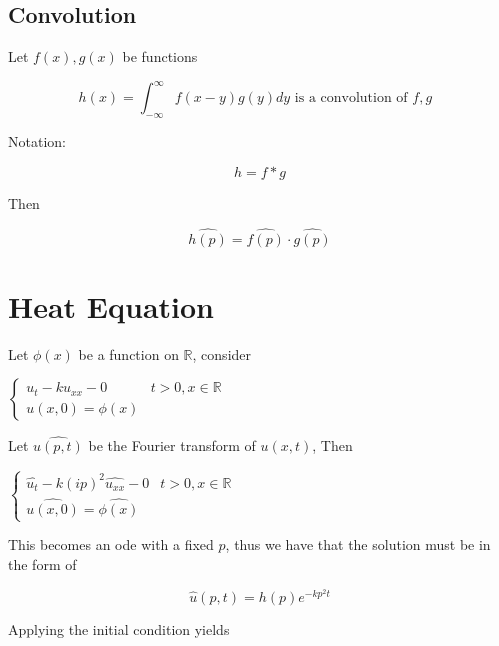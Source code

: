 \documentclass{article}
\newtheorem{one minute paper}[theorem]{One Minute Paper}
\begin{document}
\subsection*{Convolution}

Let $f(x), g(x)$ be functions

\begin{equation}
    h(x) = \int_{-\infty}^{\infty}f(x-y)g(y)dy \textrm{ is a convolution of $f, g$ }
\end{equation}

Notation:

\begin{equation}
    h = f \ast g
\end{equation}

Then

\begin{equation}
    \widehat{h(p)} = \widehat{f(p)} \cdot \widehat{g(p)}
\end{equation}

\section*{Heat Equation}

Let $\phi(x)$ be a function on $\mathbb{R}$, consider

\begin{center}
    $\begin{cases}
    u_t - ku_{xx} - 0 & t > 0, x \in \mathbb{R} \\
    u(x,0) = \phi(x)
    \end{cases}$
\end{center}

Let $\widehat{u(p,t)}$ be the Fourier transform of $u(x,t)$, Then

\begin{center}
    $\begin{cases}
    \widehat{u_t} - k(ip)^2\widehat{u_{xx}} - 0 & t > 0, x \in \mathbb{R} \\
    \widehat{u(x,0)} = \widehat{\phi(x)}
    \end{cases}$
\end{center}

This becomes an ode with a fixed $p$, thus we have that the solution must be in the form of 

\begin{equation}
    \widehat{u}(p,t) = h(p)e^{-kp^2t}
\end{equation}

Applying the initial condition yields
\end{document}
